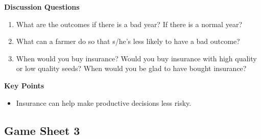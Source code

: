 \documentclass[letterpaper,10pt,english]{sphinxmanual}
\begin{document}
\textbf{Discussion Questions}
\begin{enumerate}
\item {} 
What are the outcomes if there is a bad year? If there is a normal year?

\item {} 
What can a farmer do so that s/he’s less likely to have a bad outcome?

\item {} 
When would you buy insurance? Would you buy insurance with high quality or low quality seeds? When would you be glad to have bought insurance?

\end{enumerate}

\textbf{Key Points}
\begin{itemize}
\item {} 
Insurance can help make productive decisions less risky.

\end{itemize}


\subsection{Game Sheet 3}
\label{games/gameinstructions_quickreference_en:game-sheet-3}\begin{figure}[htbp]
\centering

\end{figure}
\end{document}
